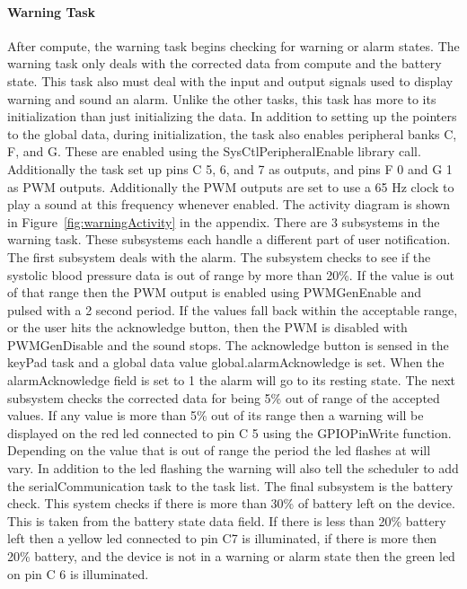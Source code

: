 \documentclass[12pt]{article} %
\begin{document}
    \paragraph{Warning Task} After compute, the warning task begins checking
    for warning or alarm states. The warning task only deals with the corrected
    data from compute and the battery state. This task also must deal with the
    input and output signals used to display warning and sound an alarm. Unlike
    the other tasks, this task has more to its initialization than just
    initializing the data. In addition to setting up the pointers to the global
    data, during initialization, the task also enables peripheral banks C, F,
    and G. These are enabled using the SysCtlPeripheralEnable library call.
    Additionally the task set up pins C 5, 6, and 7 as outputs, and pins F 0
    and G 1 as PWM outputs. Additionally the PWM outputs are set to use a 65 Hz
    clock to play a sound at this frequency whenever enabled. The activity
    diagram is shown in Figure~\ref{fig:warningActivity} in the appendix. There
    are 3 subsystems in the warning task. These subsystems each handle a
    different part of user notification. The first subsystem deals with the
    alarm. The subsystem checks to see if the systolic blood pressure data is
    out of range by more than 20\%. If the value is out of that range then the
    PWM output is enabled using PWMGenEnable and pulsed with a 2 second period.
    If the values fall back within the acceptable range, or the user hits the
    acknowledge button, then the PWM is disabled with PWMGenDisable and the
    sound stops. The acknowledge button is sensed in the keyPad task and a
    global data value global.alarmAcknowledge is set. When the alarmAcknowledge
    field is set to 1 the alarm will go to its resting state. The next
    subsystem checks the corrected data for being 5\% out of range of the
    accepted values. If any value is more than 5\% out of its range then a
    warning will be displayed on the red led connected to pin C 5 using the
    GPIOPinWrite function. Depending on the value that is out of range the
    period the led flashes at will vary. In addition to the led flashing the
    warning will also tell the scheduler to add the serialCommunication task to
    the task list. The final subsystem is the battery check. This system checks
    if there is more than 30\% of battery left on the device. This is taken
    from the battery state data field. If there is less than 20\% battery left
    then a yellow led connected to pin C7 is illuminated, if there is more then
    20\% battery, and the device is not in a warning or alarm state then the
    green led on pin C 6 is illuminated. 
    
\end{document}
